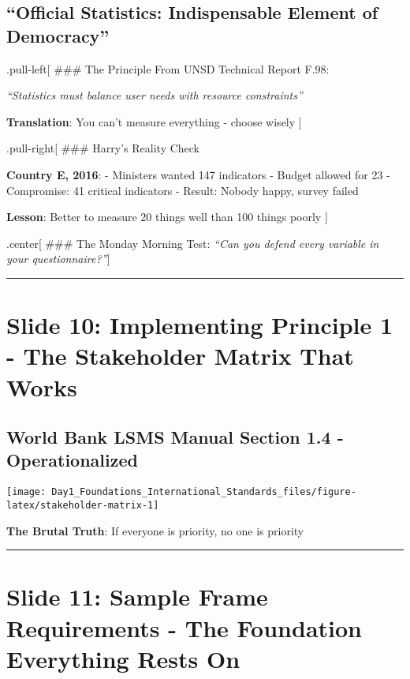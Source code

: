 \documentclass[
]{article}
\begin{document}
\subsection{``Official Statistics: Indispensable Element of
Democracy''}\label{official-statistics-indispensable-element-of-democracy}

.pull-left{[} \#\#\# The Principle From UNSD Technical Report F.98:

\emph{``Statistics must balance user needs with resource constraints''}

\textbf{Translation}: You can't measure everything - choose wisely {]}

.pull-right{[} \#\#\# Harry's Reality Check

\textbf{Country E, 2016}: - Ministers wanted 147 indicators - Budget
allowed for 23 - Compromise: 41 critical indicators - Result: Nobody
happy, survey failed

\textbf{Lesson}: Better to measure 20 things well than 100 things poorly
{]}

.center{[} \#\#\# The Monday Morning Test: \emph{``Can you defend every
variable in your questionnaire?''}{]}

\begin{center}\rule{0.5\linewidth}{0.5pt}\end{center}

\section{Slide 10: Implementing Principle 1 - The Stakeholder Matrix
That
Works}\label{slide-10-implementing-principle-1---the-stakeholder-matrix-that-works}

\subsection{World Bank LSMS Manual Section 1.4 -
Operationalized}\label{world-bank-lsms-manual-section-1.4---operationalized}

\texttt{[image: Day1\_Foundations\_International\_Standards\_files/figure-latex/stakeholder-matrix-1]}

\textbf{The Brutal Truth}: If everyone is priority, no one is priority

\begin{center}\rule{0.5\linewidth}{0.5pt}\end{center}

\section{Slide 11: Sample Frame Requirements - The Foundation Everything
Rests
On}\label{slide-11-sample-frame-requirements---the-foundation-everything-rests-on}
\end{document}
